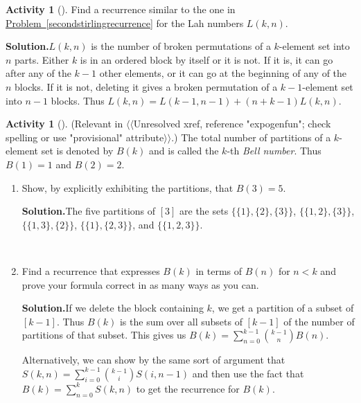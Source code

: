 \documentclass[10pt,]{book}
\theoremstyle{plain}
\theoremstyle{definition}
\newtheorem{activity}[project]{Activity}
\numberwithin{equation}{chapter}
\newcommand{\lt}{<}
\begin{document}
\begin{activity}[]\label{activity-70}
Find a recurrence similar to the one in \hyperref[secondstirlingrecurrence]{Problem~\ref{secondstirlingrecurrence}} for the Lah numbers \(L(k,n)\).%
\par\medskip\noindent%
\textbf{Solution.}\quad \(L(k,n)\) is the number of broken permutations of a \(k\)-element set into \(n\) parts. Either \(k\) is in an ordered block by itself or it is not. If it is, it can go after any of the \(k-1\) other elements, or it can go at the beginning of any of the \(n\) blocks. If it is not, deleting it gives a broken permutation of a \(k-1\)-element set into \(n-1\) blocks. Thus \(L(k,n)=L(k-1,n-1) + (n+k-1)L(k,n)\).%
\end{activity}
\begin{activity}[]\label{BellNumberIntro}
(Relevant in {$\langle\langle$Unresolved xref, reference "expogenfun"; check spelling or use "provisional" attribute$\rangle\rangle$}.) The total number of partitions of a \(k\)-element set is denoted by \(B(k)\) and is called the \(k\)-th \emph{Bell number}. Thus \(B(1)=1\) and \(B(2) =2\).%
~\par
\begin{enumerate}[label=(\alph*)]
 \item Show, by explicitly exhibiting the partitions, that \(B(3)=5\).%
\par\medskip\noindent%
\textbf{Solution.}\quad The five partitions of \([3]\) are the sets \(\{\{1\},
\{2\},\{3\}\}\), \(\{\{1,2\},\{3\}\}\), \(\{\{1,3\},\{2\}\}\), \(\{\{1\},\{2,3\}\}\), and \(\{\{1,2,3\}\}\).%

~\par
\item Find a recurrence that expresses \(B(k)\) in terms of \(B(n)\) for \(n\lt  k\) and prove your formula correct in as many ways as you can.%
\par\medskip\noindent%
\textbf{Solution.}\quad If we delete the block containing \(k\), we get a partition of a subset of \([k-1]\). Thus \(B(k)\) is the sum over all subsets of \([k-1]\) of the number of partitions of that subset. This gives us \(B(k)= \sum_{n=0}^{k-1}{k-1\choose n}B(n)\).%
\par
Alternatively, we can show by the same sort of argument that \(S(k,n)=\sum_{i=0}^{k-1} {k-1\choose i}S(i,n-1)\) and then use the fact that \(B(k)=\sum_{n=0}^k S(k,n)\) to get the recurrence for \(B(k)\).%


\end{enumerate}
\end{activity}
\end{document}
